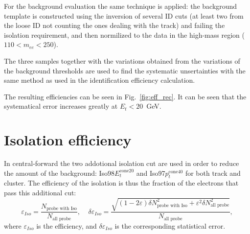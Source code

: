 For the background evaluation the same technique is applied: the background template is constructed using the inversion of several ID cuts (at least two from the loose ID not counting the ones dealing with the track) and failing the isolation requirement, and then normilized to the data in the high-mass region ($110 < m_{ee} < 250$).

The three samples together with the variations obtained from the variations of the background thresholds are used to find the systematic unsertainties with the same method as used in the identification efficiency calculation.

The resulting efficiencies can be seen in Fig.~\ref{fig:eff_rec}. It can be seen that the systematical error increases greatly at $E_{t} < 20$~GeV.

\begin{figure}
\end{figure}

\section{Isolation efficiency}

In \Zee central-forward the two addotional isolation cut are used in order to reduce the amount of the background: Iso98$E_{t}^{\mathrm{cone20}}$ and Iso97$p_{t}^{\mathrm{cone40}}$ for both track and cluster. The efficiency of the isolation is thus the fraction of the electrons that pass this additional cut:
\begin{equation}
\varepsilon_{Iso} = \frac{N_\text{probe with Iso} }{ N_\text{all probe} }, \;\;\;\;
\delta \varepsilon_{Iso} = \frac{\sqrt{(1-2\varepsilon) \delta N_\text{probe with Iso}^2 + \varepsilon^2 \delta N_\text{all probe}^2}}
                                {N_\text{all probe}},
\end{equation}
where $\varepsilon_{Iso}$ is the efficiency, and $\delta \varepsilon_{Iso}$ is the corresponding statistical error.

